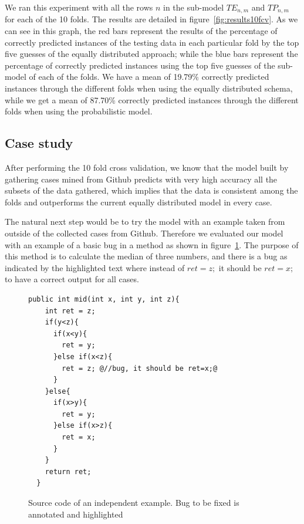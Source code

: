 \documentclass[conference]{IEEEtran}
\begin{document}
We ran this experiment with all the rows $n$ in the sub-model $TE_{n,m}$ and 
$TP_{n,m}$ for each of the 10 
folds. The results are detailed in figure~\ref{fig:results10fcv}. As we can see 
in this graph, the red bars represent the results of the percentage of correctly 
predicted instances of the testing data in each particular fold by the top five guesses of the equally distributed approach; while the blue 
bars represent the percentage of correctly predicted instances using the top five 
guesses of the sub-model of each of the folds. We have a mean of 19.79\% 
correctly predicted instances through the different folds when using the equally 
distributed schema, while we get a mean of 87.70\% correctly predicted instances 
through the different folds when using the probabilistic model. 

\subsection{Case study}
\label{sec:casestudy}

After performing the 10 fold cross validation, we know that the model built by 
gathering cases mined from Github predicts with very high accuracy all the 
subsets of the data gathered, which implies that the data is consistent among 
the folds and outperforms the current equally distributed model in every case. 

The natural next step would be to try the model with an example taken from 
outside of the collected cases from Github. Therefore we evaluated our model 
with an example of a basic bug in a method as shown in figure~\ref{fig:initialExample}. The purpose of this method is to calculate the median 
of three numbers, and there is a bug as indicated by the highlighted text where 
instead of $ret = z;$ it should be $ret = x;$ to have a correct output 
for all cases.


\begin{figure}[t]
\begin{lstlisting}[frame=single,style=base]
  public int mid(int x, int y, int z){
    int ret = z;  
    if(y<z){
      if(x<y){
        ret = y;
      }else if(x<z){
        ret = z; @//bug, it should be ret=x;@
      }
    }else{
      if(x>y){
        ret = y;
      }else if(x>z){
        ret = x;
      }
    }
    return ret;
  }	
	\end{lstlisting}
	\caption{Source code of an independent example. Bug to be fixed is annotated and highlighted}
	\label{fig:initialExample}
\end{figure}
\end{document}
